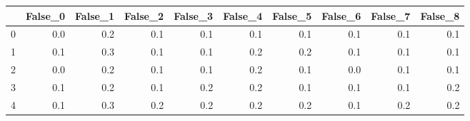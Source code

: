 \begin{tabular}{lrrrrrrrrr}
\toprule
{} &  False\_0 &  False\_1 &  False\_2 &  False\_3 &  False\_4 &  False\_5 &  False\_6 &  False\_7 &  False\_8 \\ \hline
\midrule
0 &      0.0 &      0.2 &      0.1 &      0.1 &      0.1 &      0.1 &      0.1 &      0.1 &      0.1 \\ \hline
1 &      0.1 &      0.3 &      0.1 &      0.1 &      0.2 &      0.2 &      0.1 &      0.1 &      0.1 \\ \hline
2 &      0.0 &      0.2 &      0.1 &      0.1 &      0.2 &      0.1 &      0.0 &      0.1 &      0.1 \\ \hline
3 &      0.1 &      0.2 &      0.1 &      0.2 &      0.2 &      0.1 &      0.1 &      0.1 &      0.2 \\ \hline
4 &      0.1 &      0.3 &      0.2 &      0.2 &      0.2 &      0.2 &      0.1 &      0.2 &      0.2 \\ \hline
\bottomrule
\end{tabular}
